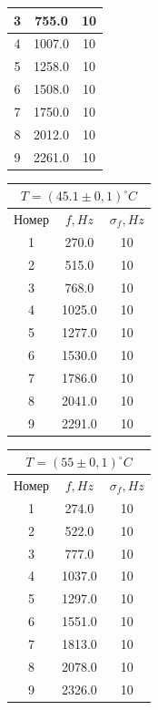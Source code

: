 \documentclass[a4paper, 12pt]{article}%
\begin{document}
\begin{enumerate}
\begin{tabular}{|c|c|c|}
3 & 755.0 & 10 \\ \hline
4 & 1007.0 & 10 \\ \hline
5 & 1258.0 & 10 \\ \hline
6 & 1508.0 & 10 \\ \hline
7 & 1750.0 & 10 \\ \hline
8 & 2012.0 & 10 \\ \hline
9 & 2261.0 & 10 \\ \hline
\end{tabular}
\begin{tabular}{|c|c|c|}
\hline
\multicolumn{3}{|c|}{$T = (45.1 \pm 0,1) ^{\circ}C$} \\ \hline
Номер & $f, Hz$ & $\sigma_f, Hz$ \\ \hline
1 & 270.0 & 10 \\ \hline
2 & 515.0 & 10 \\ \hline
3 & 768.0 & 10 \\ \hline
4 & 1025.0 & 10 \\ \hline
5 & 1277.0 & 10 \\ \hline
6 & 1530.0 & 10 \\ \hline
7 & 1786.0 & 10 \\ \hline
8 & 2041.0 & 10 \\ \hline
9 & 2291.0 & 10 \\ \hline
\end{tabular}

\begin{tabular}{|c|c|c|}
\hline
\multicolumn{3}{|c|}{$T = (55 \pm 0,1) ^{\circ}C$} \\ \hline
Номер & $f, Hz$ & $\sigma_f, Hz$ \\ \hline
1 & 274.0 & 10 \\ \hline
2 & 522.0 & 10 \\ \hline
3 & 777.0 & 10 \\ \hline
4 & 1037.0 & 10 \\ \hline
5 & 1297.0 & 10 \\ \hline
6 & 1551.0 & 10 \\ \hline
7 & 1813.0 & 10 \\ \hline
8 & 2078.0 & 10 \\ \hline
9 & 2326.0 & 10 \\ \hline
\end{tabular}



\end{enumerate}
\end{document}
